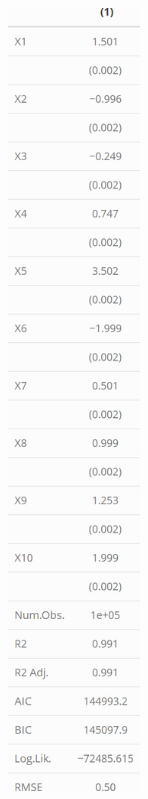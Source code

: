 \documentclass{article}
\begin{document}
\begin{enumerate}
{        \includegraphics[width=3.5cm]{summaryTable.png}
        \centering
        \\}
\end{enumerate}
\end{document}
